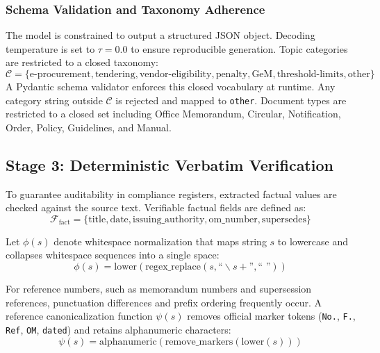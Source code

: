 \documentclass[conference]{IEEEtran}
\begin{document}
\subsubsection{Schema Validation and Taxonomy Adherence}
The model is constrained to output a structured JSON object. Decoding temperature is set to $\tau = 0.0$ to ensure reproducible generation. Topic categories are restricted to a closed taxonomy:
\begin{equation}
    \mathcal{C} = \{\text{e-procurement}, \text{tendering}, \text{vendor-eligibility}, \text{penalty}, \text{GeM}, \text{threshold-limits}, \text{other}\}
\end{equation}
A Pydantic schema validator enforces this closed vocabulary at runtime. Any category string outside $\mathcal{C}$ is rejected and mapped to \texttt{other}. Document types are restricted to a closed set including Office Memorandum, Circular, Notification, Order, Policy, Guidelines, and Manual.

\subsection{Stage 3: Deterministic Verbatim Verification}
To guarantee auditability in compliance registers, extracted factual values are checked against the source text. Verifiable factual fields are defined as:
\begin{equation}
    \mathcal{F}_{\text{fact}} = \{\text{title}, \text{date}, \text{issuing\_authority}, \text{om\_number}, \text{supersedes}\}
\end{equation}

Let $\phi(s)$ denote whitespace normalization that maps string $s$ to lowercase and collapses whitespace sequences into a single space:
\begin{equation}
    \phi(s) = \text{lower}(\text{regex\_replace}(s, \text{``}\backslash s+\text{''}, \text{`` ''}))
\end{equation}

For reference numbers, such as memorandum numbers and supersession references, punctuation differences and prefix ordering frequently occur. A reference canonicalization function $\psi(s)$ removes official marker tokens (\texttt{No.}, \texttt{F.}, \texttt{Ref}, \texttt{OM}, \texttt{dated}) and retains alphanumeric characters:
\begin{equation}
    \psi(s) = \text{alphanumeric}(\text{remove\_markers}(\text{lower}(s)))
\end{equation}
\end{document}
